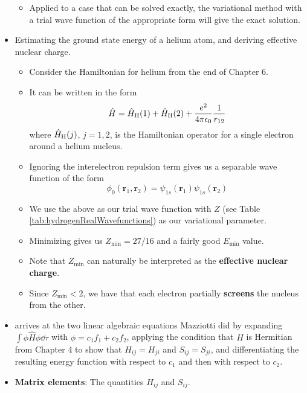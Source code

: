 \documentclass[../notes.tex]{subfiles}
\begin{document}
\begin{itemize}
\begin{itemize}
        \item Applied to a case that can be solved exactly, the variational method with a trial wave function of the appropriate form will give the exact solution.
    \end{itemize}
    \item Estimating the ground state energy of a helium atom, and deriving effective nuclear charge.
    \begin{itemize}
        \item Consider the Hamiltonian for helium from the end of Chapter 6.
        \item It can be written in the form
        \begin{equation*}
            \hat{H} = \hat{H}_{\ce{H}}(1)+\hat{H}_{\ce{H}}(2)+\frac{e^2}{4\pi\epsilon_0}\frac{1}{r_{12}}
        \end{equation*}
        where $\hat{H}_{\ce{H}}(j)$, $j=1,2$, is the Hamiltonian operator for a single electron around a helium nucleus.
        \item Ignoring the interelectron repulsion term gives us a separable wave function of the form
        \begin{equation*}
            \phi_0(\mathbf{r}_1,\mathbf{r}_2) = \psi_{1s}(\mathbf{r}_1)\psi_{1s}(\mathbf{r}_2)
        \end{equation*}
        \item We use the above as our trial wave function with $Z$ (see Table \ref{tab:hydrogenRealWavefunctions}) as our variational parameter.
        \item Minimizing gives us $Z_\text{min}=27/16$ and a fairly good $E_\text{min}$ value.
        \item Note that $Z_\text{min}$ can naturally be interpreted as the \textbf{effective nuclear charge}.
        \item Since $Z_\text{min}<2$, we have that each electron partially \textbf{screens} the nucleus from the other.
    \end{itemize}
    \item \textcite{bib:McQuarrieSimon} arrives at the two linear algebraic equations Mazziotti did by expanding $\int\phi\hat{H}\phi\dd{\tau}$ with $\phi=c_1f_1+c_2f_2$, applying the condition that $H$ is Hermitian from Chapter 4 to show that $H_{ij}=H_{ji}$ and $S_{ij}=S_{ji}$, and differentiating the resulting energy function with respect to $c_1$ and then with respect to $c_2$.
    \item \textbf{Matrix elements}: The quantities $H_{ij}$ and $S_{ij}$.

\end{itemize}
\end{document}
